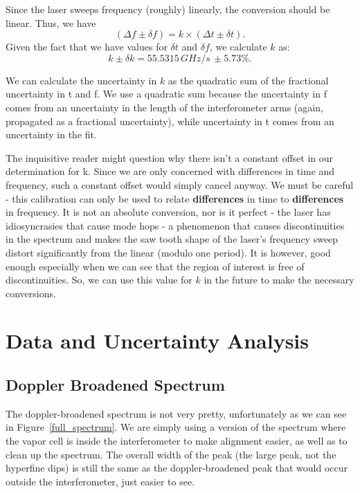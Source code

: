\documentclass{article}
\begin{document}
  \hspace{.25cm}

  Since the laser sweeps frequency (roughly) linearly, the conversion should be linear.  Thus, we have
  \begin{equation*}
    (\Delta f \pm \delta f) = k \times (\Delta t \pm \delta t).
  \end{equation*}
  Given the fact that we have values for $\delta t$ and $\delta f$, we calculate $k$ as:
  \begin{equation}
    k \pm \delta k = 55.5315 \, G\!H\!z/s \, \pm 5.73\%.
    \label{k}
  \end{equation}

  We can calculate the uncertainty in $k$ as the quadratic sum of the fractional uncertainty in t and f.  We use a quadratic sum because the uncertainty in f comes from an uncertainty in the length of the interferometer arms (again, propagated as a fractional uncertainty), while uncertainty in t comes from an uncertainty in the fit.

  \hspace{.25cm}

  The inquisitive reader might question why there isn't a constant offset in our determination for k.  Since we are only concerned with differences in time and frequency, such a constant offset would simply cancel anyway.  We must be careful - this calibration can only be used to relate \textbf{differences} in time to \textbf{differences} in frequency.  It is not an absolute conversion, nor is it perfect - the laser has idiosyncrasies that cause mode hops - a phenomenon that causes discontinuities in the spectrum and makes the saw tooth shape of the laser's frequency sweep distort significantly from the linear (modulo one period).  It is however, good enough especially when we can see that the region of interest is free of discontinuities.  So, we can use this value for $k$ in the future to make the necessary conversions.

\section{Data and Uncertainty Analysis}
  \subsection{Doppler Broadened Spectrum}
  The doppler-broadened spectrum is not very pretty, unfortunately as we can see in Figure~\ref{full_spectrum}.  We are simply using a version of the spectrum where the vapor cell is inside the interferometer to make alignment easier, as well as to clean up the spectrum.  The overall width of the peak (the large peak, not the hyperfine dips) is still the same as the doppler-broadened peak that would occur outside the interferometer, just easier to see.
\end{document}
